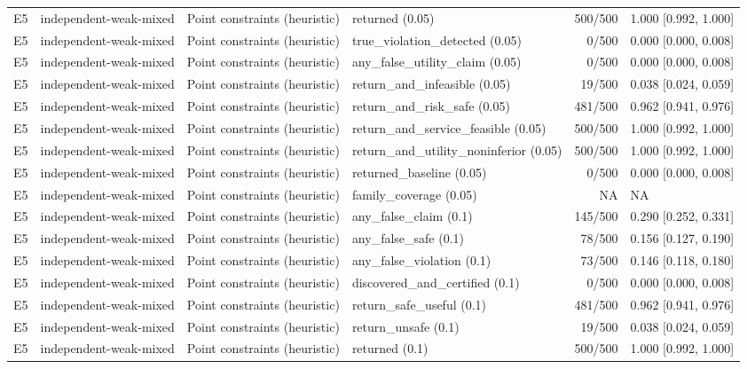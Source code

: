 \begin{longtable}{p{.04\linewidth}p{.18\linewidth}p{.19\linewidth}p{.16\linewidth}r p{.21\linewidth}}
E5 & independent-weak-mixed & Point constraints (heuristic) & returned (0.05) & 500/500 & 1.000 [0.992, 1.000]\\
E5 & independent-weak-mixed & Point constraints (heuristic) & true\_violation\_detected (0.05) & 0/500 & 0.000 [0.000, 0.008]\\
E5 & independent-weak-mixed & Point constraints (heuristic) & any\_false\_utility\_claim (0.05) & 0/500 & 0.000 [0.000, 0.008]\\
E5 & independent-weak-mixed & Point constraints (heuristic) & return\_and\_infeasible (0.05) & 19/500 & 0.038 [0.024, 0.059]\\
E5 & independent-weak-mixed & Point constraints (heuristic) & return\_and\_risk\_safe (0.05) & 481/500 & 0.962 [0.941, 0.976]\\
E5 & independent-weak-mixed & Point constraints (heuristic) & return\_and\_service\_feasible (0.05) & 500/500 & 1.000 [0.992, 1.000]\\
E5 & independent-weak-mixed & Point constraints (heuristic) & return\_and\_utility\_noninferior (0.05) & 500/500 & 1.000 [0.992, 1.000]\\
E5 & independent-weak-mixed & Point constraints (heuristic) & returned\_baseline (0.05) & 0/500 & 0.000 [0.000, 0.008]\\
E5 & independent-weak-mixed & Point constraints (heuristic) & family\_coverage (0.05) & NA & NA\\
E5 & independent-weak-mixed & Point constraints (heuristic) & any\_false\_claim (0.1) & 145/500 & 0.290 [0.252, 0.331]\\
E5 & independent-weak-mixed & Point constraints (heuristic) & any\_false\_safe (0.1) & 78/500 & 0.156 [0.127, 0.190]\\
E5 & independent-weak-mixed & Point constraints (heuristic) & any\_false\_violation (0.1) & 73/500 & 0.146 [0.118, 0.180]\\
E5 & independent-weak-mixed & Point constraints (heuristic) & discovered\_and\_certified (0.1) & 0/500 & 0.000 [0.000, 0.008]\\
E5 & independent-weak-mixed & Point constraints (heuristic) & return\_safe\_useful (0.1) & 481/500 & 0.962 [0.941, 0.976]\\
E5 & independent-weak-mixed & Point constraints (heuristic) & return\_unsafe (0.1) & 19/500 & 0.038 [0.024, 0.059]\\
E5 & independent-weak-mixed & Point constraints (heuristic) & returned (0.1) & 500/500 & 1.000 [0.992, 1.000]\\

\end{longtable}
